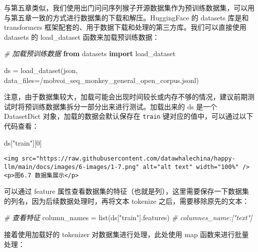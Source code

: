 \documentclass[
]{article}
\newenvironment{Shaded}{}{}
\newcommand{\BuiltInTok}[1]{\textcolor[rgb]{0.00,0.50,0.00}{#1}}
\newcommand{\CommentTok}[1]{\textcolor[rgb]{0.38,0.63,0.69}{\textit{#1}}}
\newcommand{\DecValTok}[1]{\textcolor[rgb]{0.25,0.63,0.44}{#1}}
\newcommand{\ImportTok}[1]{\textcolor[rgb]{0.00,0.50,0.00}{\textbf{#1}}}
\newcommand{\NormalTok}[1]{#1}
\newcommand{\OperatorTok}[1]{\textcolor[rgb]{0.40,0.40,0.40}{#1}}
\newcommand{\StringTok}[1]{\textcolor[rgb]{0.25,0.44,0.63}{#1}}
\begin{document}
与第五章类似，我们使用出门问问序列猴子开源数据集作为预训练数据集，可以用与第五章一致的方式进行数据集的下载和解压。HuggingFace
的 datasets 库是和 transformers
框架配套的、用于数据下载和处理的第三方库。我们可以直接使用 datasets 的
load\_dataset 函数来加载预训练数据：

\begin{Shaded}
\begin{Highlighting}[]
\CommentTok{\# 加载预训练数据}
\ImportTok{from}\NormalTok{ datasets }\ImportTok{import}\NormalTok{ load\_dataset}

\NormalTok{ds }\OperatorTok{=}\NormalTok{ load\_dataset(}\StringTok{\textquotesingle{}json\textquotesingle{}}\NormalTok{, data\_files}\OperatorTok{=}\StringTok{\textquotesingle{}/mobvoi\_seq\_monkey\_general\_open\_corpus.jsonl\textquotesingle{}}\NormalTok{)}
\end{Highlighting}
\end{Shaded}

注意，由于数据集较大，加载可能会出现时间较长或内存不够的情况，建议前期测试时将预训练数据集拆分一部分出来进行测试。加载出来的
ds 是一个 DatasetDict 对象，加载的数据会默认保存在 \texttt{train}
键对应的值中，可以通过以下代码查看：

\begin{Shaded}
\begin{Highlighting}[]
\NormalTok{ds[}\StringTok{"train"}\NormalTok{][}\DecValTok{0}\NormalTok{]}
\end{Highlighting}
\end{Shaded}

\begin{verbatim}
<img src="https://raw.githubusercontent.com/datawhalechina/happy-llm/main/docs/images/6-images/1-7.png" alt="alt text" width="100%" />
<p>图6.7 数据集展示</p>
\end{verbatim}

可以通过 feature
属性查看数据集的特征（也就是列），这里需要保存一下数据集的列名，因为后续数据处理时，再将文本
tokenize 之后，需要移除原先的文本：

\begin{Shaded}
\begin{Highlighting}[]
\CommentTok{\# 查看特征}
\NormalTok{column\_names }\OperatorTok{=} \BuiltInTok{list}\NormalTok{(ds[}\StringTok{"train"}\NormalTok{].features)}
\CommentTok{\# columnes\_name:["text"]}
\end{Highlighting}
\end{Shaded}

接着使用加载好的 tokenizer 对数据集进行处理，此处使用 map
函数来进行批量处理：
\end{document}

